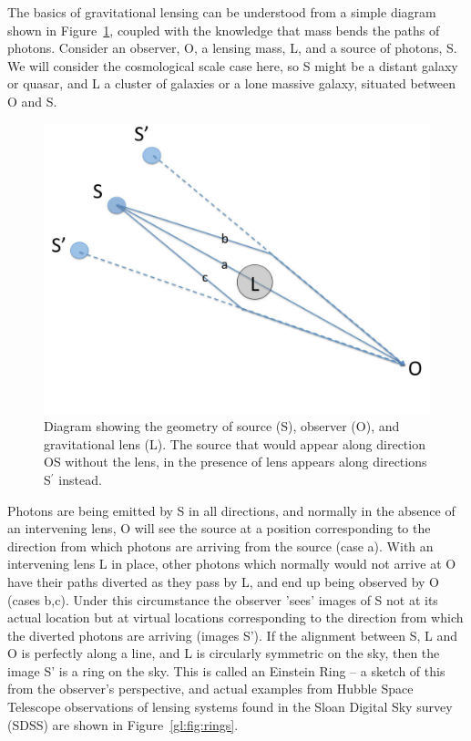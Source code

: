 The basics of gravitational lensing can be understood from a simple
diagram shown in Figure~\ref{gl:fig:geometry}, coupled with the knowledge that mass bends the paths of
photons. Consider an observer, O, a lensing mass, L, and a source
of photons, S. We will consider the cosmological scale case here, so S
might be a distant galaxy or quasar, and L a cluster of
galaxies or a lone massive galaxy, situated between O and S. 

\begin{figure}
	\begin{center}
		\includegraphics[scale=0.20]{gravitational-lensing/lensing1}
	\end{center}
	\caption{Diagram showing the geometry of source (S), observer (O), and gravitational lens (L). The source that would appear along direction OS without the lens, in the presence of lens appears along directions S$^{\prime}$ instead.}\label{gl:fig:geometry}
\end{figure}

Photons are being emitted by S in all directions, and normally in the
absence of an intervening lens, O will see the source at a position
corresponding to the direction from which photons are arriving from
the source (case a). With an intervening lens L in place, other
photons which normally would not arrive at O have their paths diverted
as they pass by L, and end up being observed by O (cases b,c). Under
this circumstance the observer 'sees' images of S not at its actual
location but at virtual locations corresponding to the direction from
which the diverted photons are arriving (images S').  If the alignment
between S, L and O is perfectly along a line, and L is circularly
symmetric on the sky, then the image S' is a ring on the sky. This is
called an Einstein Ring -- a sketch of this from the observer's
perspective, and actual examples from Hubble Space Telescope
observations of lensing systems found in the Sloan Digital Sky survey (SDSS) are shown in Figure~\ref{gl:fig:rings}.


